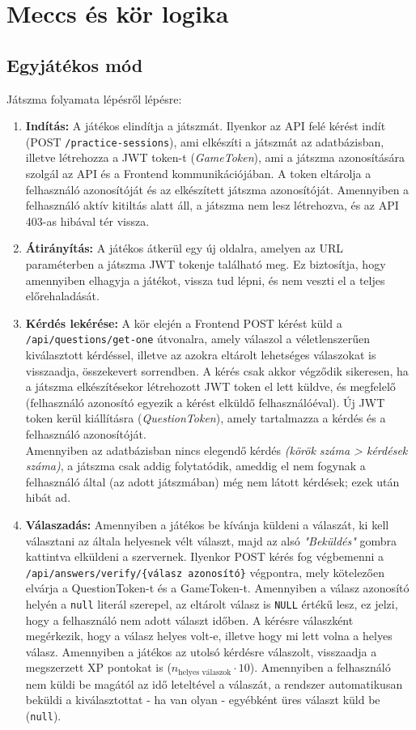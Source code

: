 \newpage
\section{Meccs és kör logika}
\subsection{Egyjátékos mód}

Játszma folyamata lépésről lépésre: 
\begin{enumerate}
    \item \textbf{Indítás:} A játékos elindítja a játszmát. Ilyenkor az API felé kérést indít (POST \texttt{/practice-sessions}), ami elkészíti a játszmát az adatbázisban, illetve létrehozza a JWT token-t (\textit{GameToken}), ami a játszma azonosítására szolgál az API és a Frontend kommunikációjában. A token eltárolja a felhasználó azonosítóját és az elkészített játszma azonosítóját. Amennyiben a felhasználó aktív kitiltás alatt áll, a játszma nem lesz létrehozva, és az API 403-as hibával tér vissza.
    \item \textbf{Átirányítás:} A játékos átkerül egy új oldalra, amelyen az URL paraméterben a játszma JWT tokenje található meg. Ez biztosítja, hogy amennyiben elhagyja a játékot, vissza tud lépni, és nem veszti el a teljes előrehaladását.
    \item \textbf{Kérdés lekérése:} A kör elején a Frontend POST kérést küld a \texttt{/api/questions/get-one} útvonalra, amely válaszol a véletlenszerűen kiválasztott kérdéssel, illetve az azokra eltárolt lehetséges válaszokat is visszaadja, összekevert sorrendben. A kérés csak akkor végződik sikeresen, ha a játszma elkészítésekor létrehozott JWT token el lett küldve, és megfelelő (felhasználó azonosító egyezik a kérést elküldő felhasználóéval). Új JWT token kerül kiállításra (\textit{QuestionToken}), amely tartalmazza a kérdés és a felhasználó azonosítóját. 
    \\
    Amennyiben az adatbázisban nincs elegendő kérdés \textit{(körök száma > kérdések száma)}, a játszma csak addig folytatódik, ameddig el nem fogynak a felhasználó által (az adott játszmában) még nem látott kérdések; ezek után hibát ad.
    \item \textbf{Válaszadás:} Amennyiben a játékos be kívánja küldeni a válaszát, ki kell választani az általa helyesnek vélt választ, majd az alsó \textit{"Beküldés"} gombra kattintva elküldeni a szervernek. Ilyenkor POST kérés fog végbemenni a \texttt{/api/answers/verify/\{válasz azonosító\}} végpontra, mely kötelezően elvárja a QuestionToken-t és a GameToken-t. Amennyiben a válasz azonosító helyén a \texttt{null} literál szerepel, az eltárolt válasz is \texttt{NULL} értékű lesz, ez jelzi, hogy a felhasználó nem adott választ időben. A kérésre válaszként megérkezik, hogy a válasz helyes volt-e, illetve hogy mi lett volna a helyes válasz. Amennyiben a játékos az utolsó kérdésre válaszolt, visszaadja a megszerzett XP pontokat is ($n_{\text{helyes válaszok}} \cdot 10$). Amennyiben a felhasználó nem küldi be magától az idő leteltével a válaszát, a rendszer automatikusan beküldi a kiválasztottat - ha van olyan - egyébként üres választ küld be (\texttt{null}).
\end{enumerate}

